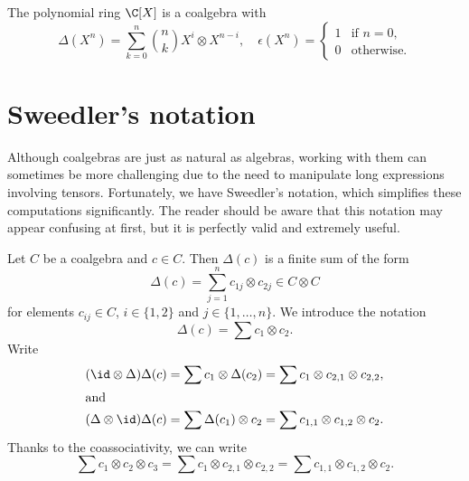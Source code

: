 \begin{example}
    The polynomial ring $\C[X]$ is a coalgebra
    with 
    \[
    \Delta(X^n)=\sum_{k=0}^n\binom{n}{k}X^i\otimes X^{n-i},\quad \epsilon(X^n)=\begin{cases}
        1 & \text{if $n=0$,}\\
        0 & \text{otherwise.}
    \end{cases}
    \]
\end{example}
    

\section{Sweedler's notation}

Although coalgebras are just as natural as algebras, working with them can sometimes be more challenging due to the need to manipulate long expressions involving tensors. Fortunately, we have Sweedler's notation, which simplifies these computations significantly. The reader should be aware that this notation may appear confusing at first, but it is perfectly valid and extremely useful.

Let $C$ be a coalgebra and $c\in C$. Then $\Delta(c)$ is
a finite sum of the form 
\[
\Delta(c)=\sum_{j=1}^n c_{1j}\otimes c_{2j}\in C\otimes C
\]
for elements $c_{ij}\in C$, $i\in\{1,2\}$ 
and $j\in\{1,\dots,n\}$. We introduce the notation 
\[
\Delta(c)=\sum c_{1}\otimes c_{2}.
\]
Write 
\begin{align*}
(\id\otimes\Delta)\Delta(c)&=\sum c_1\otimes\Delta(c_2)=\sum c_1\otimes c_{2,1}\otimes c_{2,2},\\
\shortintertext{and}
(\Delta\otimes\id)\Delta(c)&=\sum\Delta(c_1)\otimes c_2
    =\sum c_{1,1}\otimes c_{1,2}\otimes c_{2}. 
\end{align*}
Thanks to the coassociativity, we can write 
\[
\sum c_{1}\otimes c_{2}\otimes c_{3}
=\sum c_1\otimes c_{2,1}\otimes c_{2,2}
=\sum c_{1,1}\otimes c_{1,2}\otimes c_{2}.
\]

